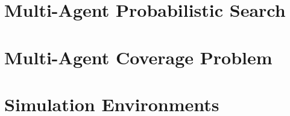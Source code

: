 \section{Multi-Agent Probabilistic Search}


\section{Multi-Agent Coverage Problem}


\section{Simulation Environments}


